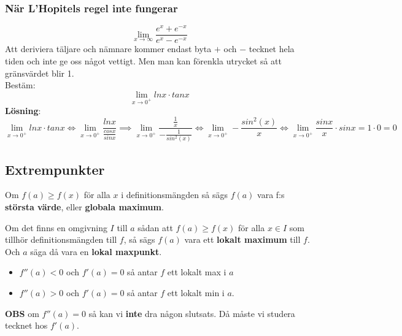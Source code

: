 \documentclass{report}
\begin{document}
\pagebreak

\subsubsection{När L'Hopitels regel inte fungerar}
\ex{}
{
\begin{equation*}
	\lim_{x \to \infty} \frac{e^x+e^{-x}}{e^x - e^{-x}} 
\end{equation*}
Att deriviera täljare och nämnare kommer endast byta $ + $ och $ - $ tecknet hela tiden och inte ge oss något vettigt. Men man kan förenkla utrycket så att gränsvärdet blir 1.
}
\noindent
\dotfill\\
\ex{}
{
Bestäm:
\begin{equation*}
\lim_{x \to 0^+} lnx \cdot tanx 
\end{equation*}
\textbf{Lösning}:\\
\begin{equation*}
\lim_{x \to 0^+} lnx \cdot tanx \iff \lim_{x \to 0^+} \frac{lnx}{ \frac{cosx}{sinx} } \implies \lim_{x \to 0^+} \frac{ \frac{1}{x} }{ - \frac{1}{sin^2(x)}  } \iff \lim_{x \to 0^+} - \frac{sin^2(x)}{x} \iff  \lim_{x \to 0^+} \frac{sinx}{x} \cdot sinx = 1 \cdot 0 = 0
\end{equation*}
}

\subsection{Extrempunkter}
{
Om $ f(a) \ge f(x) $ för alla $ x $ i definitionsmängden så sägs $ f(a) $ vara f:s \textbf{största värde}, eller \textbf{globala maximum}. 
}

{
Om det finns en omgivning $ I $ till $ a $ sådan att $ f(a) \ge f(x) $ för alla $ x \in I $ som tillhör definitionsmängden till $ f $, så sägs $ f(a) $ vara ett \textbf{lokalt maximum} till $ f $. Och $ a $ säga då vara en \textbf{lokal maxpunkt}. 
}


{
\begin{itemize}
	\item $ f''(a) < 0 $ och $ f'(a) = 0 $ så antar $ f $ ett lokalt max i $ a $
	\item $ f''(a) > 0 $ och $ f'(a) = 0 $ så antar $ f $ ett lokalt min i $ a $.
\end{itemize}

\textbf{OBS} om $ f''(a) = 0 $ så kan vi \textbf{inte} dra någon slutsats. Då måste vi studera tecknet hos $ f'(a) $.
}
\end{document}
